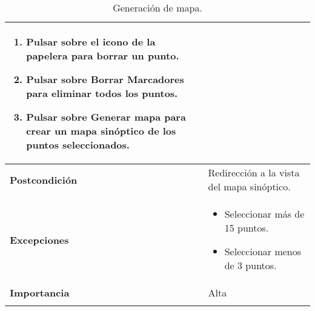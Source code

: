 \begin{longtable}[H]{@{}l|l@{}}
\begin{minipage}[t]{0.71\columnwidth}
\begin{enumerate}
			\item Pulsar sobre el icono de la papelera para borrar un punto.
			\item Pulsar sobre Borrar Marcadores para eliminar todos los puntos.
			\item Pulsar sobre Generar mapa para crear un mapa sinóptico de los puntos seleccionados.
		\end{enumerate}
	\end{minipage}\tabularnewline
	\midrule
	\begin{minipage}[t]{0.23\columnwidth}\raggedright\strut
		\textbf{Postcondición}\strut
	\end{minipage} & \begin{minipage}[t]{0.71\columnwidth}\raggedright\strut
		Redirección a la vista del mapa sinóptico.\strut
	\end{minipage}\tabularnewline
	\midrule
	\begin{minipage}[t]{0.23\columnwidth}\raggedright\strut
		\textbf{Excepciones}\strut
	\end{minipage} & \begin{minipage}[t]{0.71\columnwidth}\raggedright\strut
		\begin{itemize}
			\tightlist
			\item Seleccionar más de 15 puntos.
			\item Seleccionar menos de 3 puntos.
		\end{itemize}
	\end{minipage}\tabularnewline
	\midrule
	\begin{minipage}[t]{0.23\columnwidth}\raggedright\strut
		\textbf{Importancia}\strut
	\end{minipage} & \begin{minipage}[t]{0.71\columnwidth}\raggedright\strut
		Alta\strut
	\end{minipage}\tabularnewline
	\bottomrule
	\caption{Generación de mapa.}
	\label{cu:2}
\end{longtable}
\newpage


